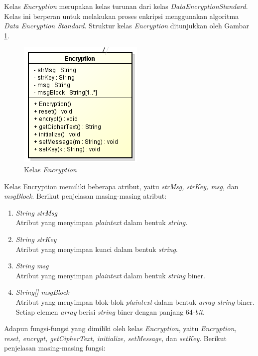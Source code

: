 Kelas \textit{Encryption} merupakan kelas turunan dari kelas \textit{DataEncryptionStandard}. Kelas ini berperan untuk melakukan proses enkripsi menggunakan algoritma \textit{Data Encryption Standard}. Struktur kelas \textit{Encryption} ditunjukkan oleh Gambar \ref{fig:classdesencryption}.

\begin{figure}[H]
	\centering
	\includegraphics[scale=0.6]{Gambar/class_des_encryption}
	\caption{Kelas \textit{Encryption}}\label{fig:classdesencryption}
\end{figure}

Kelas Encryption memiliki beberapa atribut, yaitu \textit{strMsg, strKey, msg,} dan \textit{msgBlock}. Berikut penjelasan masing-masing atribut:

\begin{enumerate}
	\item \textit{String strMsg} \\
	Atribut yang menyimpan \textit{plaintext} dalam bentuk \textit{string}.
	\item \textit{String strKey} \\
	Atribut yang menyimpan kunci dalam bentuk \textit{string}.
	\item \textit{String msg} \\
	Atribut yang menyimpan \textit{plaintext} dalam bentuk \textit{string} biner.
	\item \textit{String[] msgBlock} \\
	Atribut yang menyimpan blok-blok \textit{plaintext} dalam bentuk \textit{array string} biner. Setiap elemen \textit{array} berisi \textit{string} biner dengan panjang 64-\textit{bit}.
\end{enumerate}

Adapun fungsi-fungsi yang dimiliki oleh kelas \textit{Encryption}, yaitu \textit{Encryption, reset, encrypt, getCipherText, initialize, setMessage,} dan \textit{setKey}. Berikut penjelasan masing-masing fungsi:

